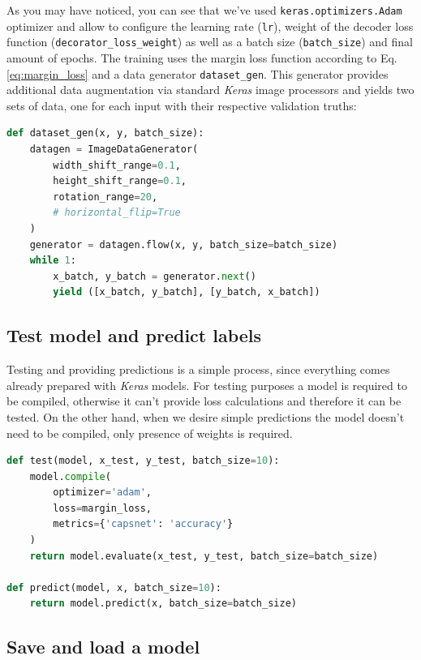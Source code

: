 As you may have noticed, you can see that we've used \texttt{keras.optimizers.Adam} optimizer and allow to configure the learning rate (\texttt{lr}), weight of the decoder loss function (\texttt{decorator\_loss\_weight}) as well as a batch size (\texttt{batch\_size}) and final amount of epochs. The training uses the margin loss function according to Eq.\,\ref{eq:margin_loss} and a data generator \texttt{dataset\_gen}. This generator provides additional data augmentation via standard \textit{Keras} image processors and yields two sets of data, one for each input with their respective validation truths:

\begin{lstlisting}[language=Python, caption=Data generator example]
def dataset_gen(x, y, batch_size):
    datagen = ImageDataGenerator(
        width_shift_range=0.1,
        height_shift_range=0.1,
        rotation_range=20,
        # horizontal_flip=True
    )
    generator = datagen.flow(x, y, batch_size=batch_size)
    while 1:
        x_batch, y_batch = generator.next()
        yield ([x_batch, y_batch], [y_batch, x_batch])
\end{lstlisting}

\subsection{Test model and predict labels}

Testing and providing predictions is a simple process, since everything comes already prepared with \textit{Keras} models. For testing purposes a model is required to be compiled, otherwise it can't provide loss calculations and therefore it can be tested. On the other hand, when we desire simple predictions the model doesn't need to be compiled, only presence of weights is required.

\begin{lstlisting}[language=Python, caption=Test run and prediction of a \textit{Keras} model example]
def test(model, x_test, y_test, batch_size=10):
    model.compile(
        optimizer='adam',
        loss=margin_loss,
        metrics={'capsnet': 'accuracy'}
    )
    return model.evaluate(x_test, y_test, batch_size=batch_size)

def predict(model, x, batch_size=10):
    return model.predict(x, batch_size=batch_size)
\end{lstlisting}

\subsection{Save and load a model}
\label{ss:save_model}


